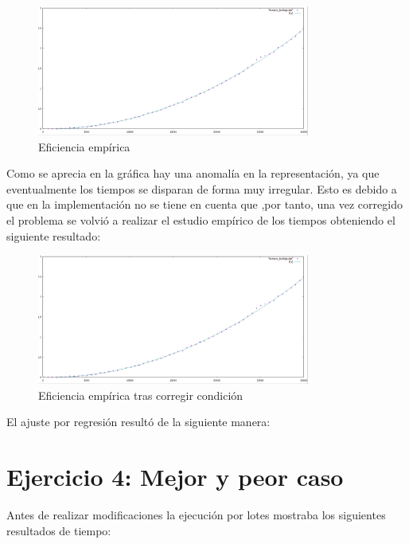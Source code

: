\documentclass[paper=a4, fontsize=10pt]{scrartcl} %
\begin{document}
\begin{figure}[H] %
	\centering
	\label{lsblk}
	\includegraphics[width=0.8\textwidth]{../imgs/c3.PNG}
	\caption{Eficiencia empírica} 
\end{figure}

Como se aprecia en la gráfica hay una anomalía en la representación, ya que eventualmente los tiempos se disparan de forma muy irregular. Esto es debido a que en la implementación no se tiene en cuenta que 
,por tanto, una vez corregido el problema se volvió a realizar el estudio empírico de los tiempos obteniendo el siguiente resultado:

\begin{figure}[H] %
	\centering
	\label{lsblk}
	\includegraphics[width=0.8\textwidth]{../imgs/c3.PNG}
	\caption{Eficiencia empírica tras corregir condición} 
\end{figure}

El ajuste por regresión resultó de la siguiente manera:



\section{Ejercicio 4:  Mejor y peor caso}
Antes de realizar modificaciones la ejecución por lotes mostraba los siguientes resultados de tiempo:
\end{document}
